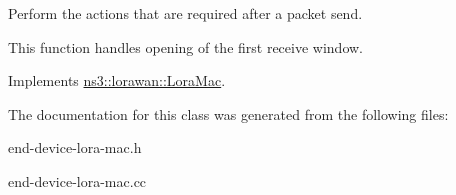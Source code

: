 Perform the actions that are required after a packet send.

This function handles opening of the first receive window. 

Implements \hyperlink{classns3_1_1lorawan_1_1LoraMac_aa64037192af83dc459487bccccd10bdf}{ns3\+::lorawan\+::\+Lora\+Mac}.



The documentation for this class was generated from the following files\+:\begin{DoxyCompactItemize}
\item 
end-\/device-\/lora-\/mac.\+h\item 
end-\/device-\/lora-\/mac.\+cc\end{DoxyCompactItemize}
